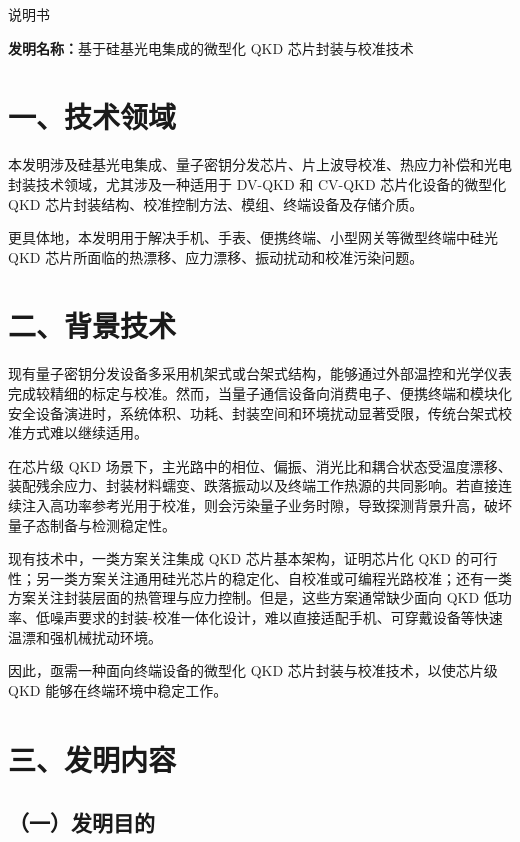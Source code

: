 \documentclass[12pt,a4paper]{article}
\begin{document}
\begin{center}
    {\Huge\heiti 说明书}
\end{center}

\vspace{1em}

\noindent\textbf{发明名称：}基于硅基光电集成的微型化 QKD 芯片封装与校准技术

\section*{一、技术领域}

本发明涉及硅基光电集成、量子密钥分发芯片、片上波导校准、热应力补偿和光电封装技术领域，尤其涉及一种适用于 DV-QKD 和 CV-QKD 芯片化设备的微型化 QKD 芯片封装结构、校准控制方法、模组、终端设备及存储介质。

更具体地，本发明用于解决手机、手表、便携终端、小型网关等微型终端中硅光 QKD 芯片所面临的热漂移、应力漂移、振动扰动和校准污染问题。

\section*{二、背景技术}

现有量子密钥分发设备多采用机架式或台架式结构，能够通过外部温控和光学仪表完成较精细的标定与校准。然而，当量子通信设备向消费电子、便携终端和模块化安全设备演进时，系统体积、功耗、封装空间和环境扰动显著受限，传统台架式校准方式难以继续适用。

在芯片级 QKD 场景下，主光路中的相位、偏振、消光比和耦合状态受温度漂移、装配残余应力、封装材料蠕变、跌落振动以及终端工作热源的共同影响。若直接连续注入高功率参考光用于校准，则会污染量子业务时隙，导致探测背景升高，破坏量子态制备与检测稳定性。

现有技术中，一类方案关注集成 QKD 芯片基本架构，证明芯片化 QKD 的可行性；另一类方案关注通用硅光芯片的稳定化、自校准或可编程光路校准；还有一类方案关注封装层面的热管理与应力控制。但是，这些方案通常缺少面向 QKD 低功率、低噪声要求的封装-校准一体化设计，难以直接适配手机、可穿戴设备等快速温漂和强机械扰动环境。

因此，亟需一种面向终端设备的微型化 QKD 芯片封装与校准技术，以使芯片级 QKD 能够在终端环境中稳定工作。

\section*{三、发明内容}

\subsection*{（一）发明目的}
\end{document}
